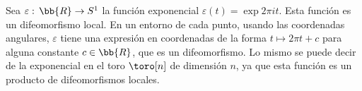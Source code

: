 \begin{ejemplo}
	Sea $\varepsilon:\,\bb{R}\rightarrow S^{1}$ la funci\'{o}n
	exponencial $\varepsilon(t)=\exp{2\pi it}$. Esta funci\'{o}n
	es un difeomorfismo local. En un entorno de cada punto, usando
	las coordenadas angulares, $\varepsilon$ tiene una expresi\'{o}n
	en coordenadas de la forma $t\mapsto 2\pi t+c$ para alguna constante
	$c\in\bb{R}$, que es un difeomorfismo. Lo mismo se puede decir
	de la exponencial en el toro $\toro[n]$ de dimensi\'{o}n $n$, ya
	que esta funci\'{o}n es un producto de difeomorfismos locales.
\end{ejemplo}

